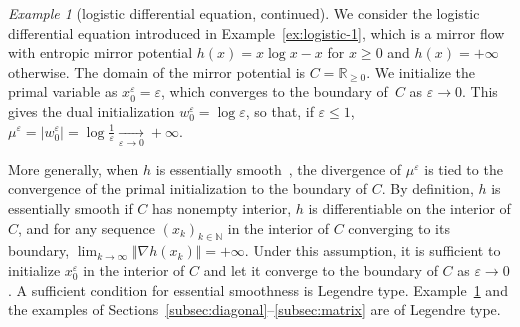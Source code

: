\documentclass[11pt,english,reqno]{article}
\newcommand{\N}{\mathbb{N}}
\newcommand{\R}{\mathbb{R}}
\renewcommand{\leq}{\leqslant}
\renewcommand{\geq}{\geqslant}
\theoremstyle{plain}
\theoremstyle{definition}
\theoremstyle{remark}
\newtheorem{example}[proposition]{Example}
\numberwithin{equation}{section}
\begin{document}
\begin{example}[logistic differential equation, continued]
	\label{ex:logistic-4}
	We consider the logistic differential equation introduced in Example~\ref{ex:logistic-1}, which is a mirror flow with entropic mirror potential $h(x) = x \log x - x$ for $x \geq 0$ and $h(x) = +\infty$ otherwise. The domain of the mirror potential is $C = \R_{\geq 0}$. We initialize the primal variable as $x^\varepsilon_0 = \varepsilon$, which converges to the boundary of~$C$ as $\varepsilon \to 0$. This gives the dual initialization $w^\varepsilon_0 = \log \varepsilon$, so that, if $\varepsilon \leq 1$, $\mu^\varepsilon = \vert w^\varepsilon_0 \vert = \log \frac{1}{\varepsilon} \xrightarrow[\varepsilon\to 0]{} +\infty$.
\end{example}

More generally, when $h$ is essentially smooth~\cite[Sec.~26]{rockafellar1970convex}, the divergence of $\mu^\varepsilon$ is tied to the convergence of the primal initialization to the boundary of $C$. By definition, $h$ is essentially smooth if $C$ has nonempty interior, $h$ is differentiable on the interior of $C$, and for any sequence $(x_k)_{k \in \N}$ in the interior of $C$ converging to its boundary, $\lim_{k \to \infty} \Vert \nabla h(x_k) \Vert = +\infty$. Under this assumption, it is sufficient to initialize $x^\varepsilon_0$ in the interior of $C$ and let it converge to the boundary of $C$ as $\varepsilon \to 0$. A sufficient condition for essential smoothness is Legendre type. Example~\ref{ex:logistic-4} and the examples of Sections~\ref{subsec:diagonal}--\ref{subsec:matrix} are of Legendre type.
\end{document}
